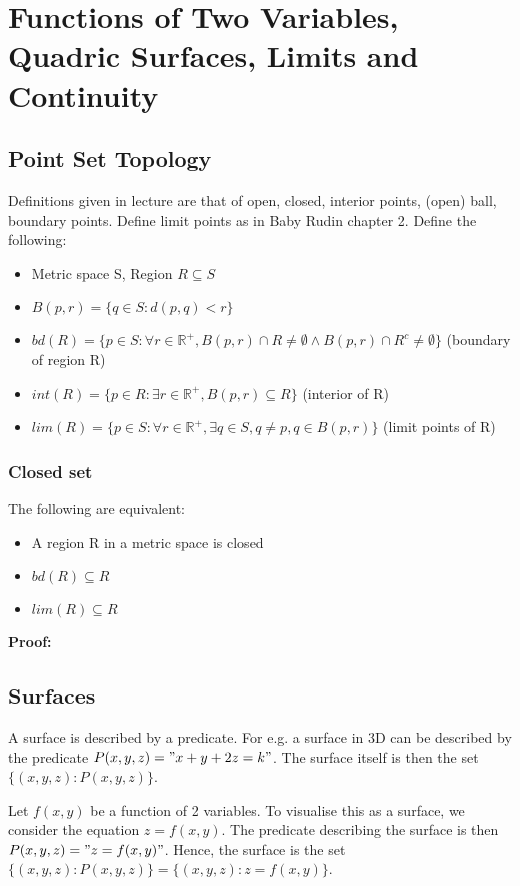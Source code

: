 \documentclass{article}
\begin{document}
\section{Functions of Two Variables, Quadric Surfaces, Limits and Continuity}

\subsection{Point Set Topology}
Definitions given in lecture are that of open, closed, interior points, (open) ball, boundary points.
Define limit points as in Baby Rudin chapter 2.
Define the following:
\begin{itemize}
	\item Metric space S, Region $R\subseteq S$ 
	\item $B(p, r) = \{q\in S : d(p,q)<r\}$ 
	\item $bd(R) = \{p\in S : \forall r\in \mathbb{R}^+, B(p,r) \cap R\neq \emptyset \land B(p,r)\cap R^c\neq \emptyset \}$ (boundary of region R)
	\item $int(R) = \{p\in R : \exists r\in \mathbb{R}^+, B(p,r) \subseteq R\}$ (interior of R)
	\item $lim(R) = \{p\in S :  \forall r\in \mathbb{R}^+, \exists q\in S, q\neq p, q\in B(p,r)\}$ (limit points of R)
\end{itemize}



\subsubsection{Closed set}
The following are equivalent:\\
\begin{itemize}
	\item A region R in a metric space is closed
	\item $bd(R)\subseteq R$
	\item $lim(R)\subseteq R$
\end{itemize}
\textbf{Proof:}


\subsection{Surfaces}
A surface is described by a predicate. For e.g. a surface in 3D can be described by the predicate $P(x,y,z)="x+y+2z=k"$. The surface itself is then the set $\{(x,y,z):P(x,y,z)\}$.

Let $f(x,y)$ be a function of 2 variables. To visualise this as a surface, we consider the equation $z=f(x,y)$. The predicate describing the surface is then $P(x,y,z)="z=f(x,y)"$. Hence, the surface is the set $\{(x,y,z):P(x,y,z)\}=\{(x,y,z):z=f(x,y)\}$.
\end{document}

